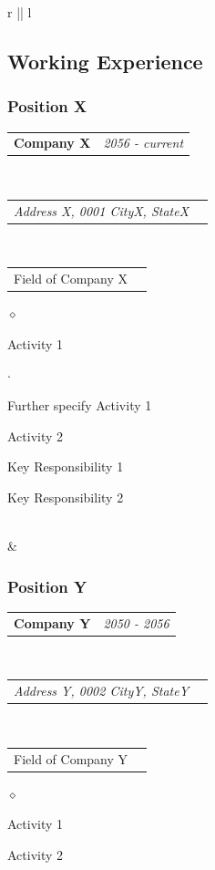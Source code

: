 \documentclass[a4paper]{article}
\makeatletter
\newlength{\sectsep}
\newlength{\subsectsep}
\newcommand{\headerrow}[2]
{\begin{tabular*}{\textwidth}{l@{\extracolsep{\fill}}r}
	#1 &
	#2 \\
\end{tabular*}}
\renewenvironment{itemize}{
  \begin{list}{$\diamond$}{
    \setlength{\topsep}{0.25em}
    \setlength{\itemsep}{0em}
    \setlength{\parskip}{0pt}
    \setlength{\parsep}{0em}
  }
}{
  \end{list}
}
\newenvironment{itemize2}{
  \begin{list}{$\cdot$}{
    \setlength{\topsep}{0.25em}
    \setlength{\itemsep}{0em}
    \setlength{\parskip}{0pt}
    \setlength{\parsep}{0em}
  }
}{
  \end{list}
}
\makeatother
\begin{document}
\begin{longtable}{r || l}
\begin{minipage}{0.9\textwidth}
      \subsection*{Working Experience}
      \subsubsection*{Position X}
      \headerrow
  		{\textbf{Company X}}{\emph{2056 - current}}
      \\
      \headerrow
        {\emph{Address X, 0001 CityX, StateX}}{}
      \\
      \headerrow
        {Field of Company X}{}

      \begin{itemize}
          \item Activity 1
          \begin{itemize2}
              \item Further specify Activity 1
          \end{itemize2}
          \item Activity 2
          \item Key Responsibility 1
          \item Key Responsibility 2
      \end{itemize}
  \end{minipage} \\[\sectsep]

  & \begin{minipage}{0.9\textwidth}
      \vspace{\subsectsep}
      \subsubsection*{Position Y}
      \headerrow
  		{\textbf{Company Y}}{\emph{2050 - 2056}}
      \\
      \headerrow
        {\emph{Address Y, 0002 CityY, StateY}}{}
      \\
      \headerrow
          {Field of Company Y}{}

      \begin{itemize}
          \item Activity 1
          \item Activity 2
      \end{itemize}
  \end{minipage} \\[\sectsep]


\end{longtable}
\end{document}
